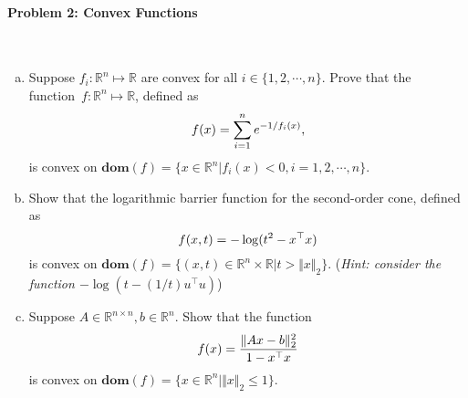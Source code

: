\documentclass[a4paper]{article}
\begin{document}
\paragraph{Problem 2: Convex Functions}
~\\

\noindent
\begin{enumerate}[a)]

    \item Suppose $f_i:\mathbb{R}^n \mapsto \mathbb{R}$ are convex for all $i\in\{1,2,\cdots,n\}$. Prove that the function~$f:\mathbb{R}^n \mapsto \mathbb{R}$, defined as
    \begin{equation}
    f(x) = \sum^n_{i=1} e^{-1/f_i(x)}, \notag
    \end{equation}
    is convex on $\textbf{dom}(f)=\{x\in\mathbb{R}^n \vert f_i(x)<0,i=1,2,\cdots,n\}$.
    
    \item Show that the logarithmic barrier function for the second-order cone, defined as
    \begin{equation}
        f(x,t) = -\log(t^2-x^{\top}x) \notag
    \end{equation}
    is convex on $\textbf{dom}(f)=\{(x,t)\in\mathbb{R}^n\times\mathbb{R} | t>\Vert x\Vert_2\}$. (\textit{Hint: consider the function $-\log(t-(1/t)u^{\top}u)$})
    
    \item Suppose $A\in\mathbb{R}^{n\times n}, b\in\mathbb{R}^{n}$. Show that the function
    \begin{equation}
        f(x)=\frac{\Vert Ax-b\Vert^2_2}{1-x^{\top}x} \notag
    \end{equation}
    is convex on $\textbf{dom}(f)=\{x\in\mathbb{R}^n|\Vert x\Vert_2\le 1\}$.

\end{enumerate}
\end{document}
